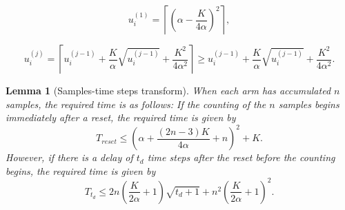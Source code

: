 \documentclass[10pt,a4paper]{amsart}
\newtheorem{lemma}{Lemma}
\begin{document}
    \begin{equation}
        u_{i}^{(1)}=\left\lceil\left(\alpha-\frac{K}{4\alpha}\right)^{2}\right\rceil, \label{eqn:algscheme_initial}
    \end{equation}

    \begin{equation}
        u_{i}^{(j)}=\left\lceil u_{i}^{(j-1)}+\frac{K}{\alpha}\sqrt{u_{i}^{(j-1)}}+\frac{K^{2}}{4\alpha^{2}}\right\rceil\geq u_{i}^{(j-1)}+\frac{K}{\alpha}\sqrt{u_{i}^{(j-1)}}+\frac{K^{2}}{4\alpha^{2}}. \label{eqn:algscheme}
    \end{equation}

\begin{lemma}[Samples-time steps transform]\label{applemma:samples-time}
    When each arm has accumulated \(n\) samples, the required time is as follows: 
    If the counting of the \(n\) samples begins immediately after a reset, the required time is given by
    \begin{equation}\label{eqn:Treset}
        T_{reset}\leq \left(\alpha+\frac{\left(2n-3\right)K}{4\alpha}+n\right)^2+K.
    \end{equation}
    However, if there is a delay of \(t_{d}\) time steps after the reset before the counting begins, the required time is given by 
    \begin{equation}\label{eqn:Ttd}
        T_{t_{d}}\leq 2n\left(\frac{K}{2\alpha}+1\right)\sqrt{t_{d}+1}+n^{2}\left(\frac{K}{2\alpha}+1\right)^{2}.
    \end{equation}
    
\end{lemma}
\end{document}
